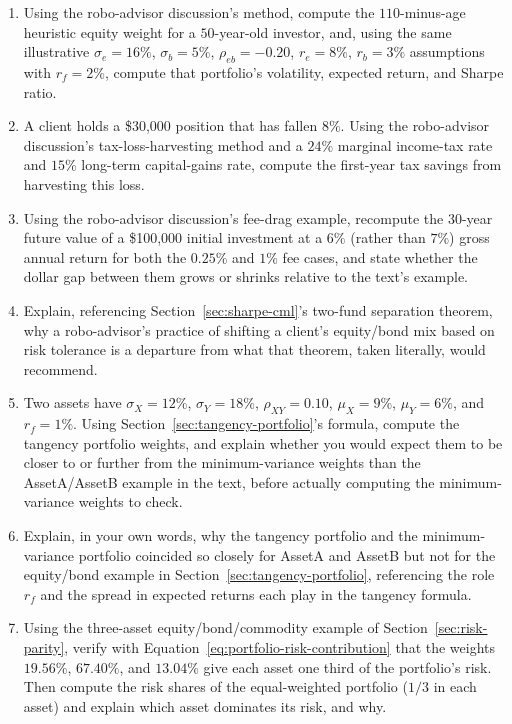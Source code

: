 \documentclass[../ai_in_finance]{subfiles}
\begin{document}
\begin{enumerate}[exercises]
    \item Using the robo-advisor discussion's method, compute the $110$-minus-age heuristic equity weight for a $50$-year-old investor, and, using the same illustrative $\sigma_e=16\%$, $\sigma_b=5\%$, $\rho_{eb}=-0.20$, $r_e=8\%$, $r_b=3\%$ assumptions with $r_f=2\%$, compute that portfolio's volatility, expected return, and Sharpe ratio.
    \item A client holds a \$30,000 position that has fallen $8\%$. Using the robo-advisor discussion's tax-loss-harvesting method and a $24\%$ marginal income-tax rate and $15\%$ long-term capital-gains rate, compute the first-year tax savings from harvesting this loss.
    \item Using the robo-advisor discussion's fee-drag example, recompute the $30$-year future value of a \$100,000 initial investment at a $6\%$ (rather than $7\%$) gross annual return for both the $0.25\%$ and $1\%$ fee cases, and state whether the dollar gap between them grows or shrinks relative to the text's example.
    \item Explain, referencing Section~\ref{sec:sharpe-cml}'s two-fund separation theorem, why a robo-advisor's practice of shifting a client's equity/bond mix based on risk tolerance is a departure from what that theorem, taken literally, would recommend.
    \item Two assets have $\sigma_X=12\%$, $\sigma_Y=18\%$, $\rho_{XY}=0.10$, $\mu_X=9\%$, $\mu_Y=6\%$, and $r_f=1\%$. Using Section~\ref{sec:tangency-portfolio}'s formula, compute the tangency portfolio weights, and explain whether you would expect them to be closer to or further from the minimum-variance weights than the AssetA/AssetB example in the text, before actually computing the minimum-variance weights to check.
    \item Explain, in your own words, why the tangency portfolio and the minimum-variance portfolio coincided so closely for AssetA and AssetB but not for the equity/bond example in Section~\ref{sec:tangency-portfolio}, referencing the role $r_f$ and the spread in expected returns each play in the tangency formula.
    \item Using the three-asset equity/bond/commodity example of Section~\ref{sec:risk-parity}, verify with Equation~\eqref{eq:portfolio-risk-contribution} that the weights $19.56\%$, $67.40\%$, and $13.04\%$ give each asset one third of the portfolio's risk. Then compute the risk shares of the equal-weighted portfolio ($1/3$ in each asset) and explain which asset dominates its risk, and why.

\end{enumerate}
\end{document}
